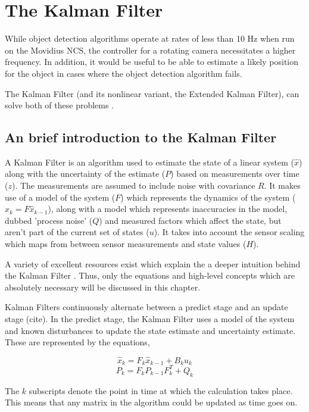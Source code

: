 \section{The Kalman Filter}

While object detection algorithms operate at rates of less than 10 Hz when run on the Movidius NCS, the controller for a rotating camera necessitates a higher frequency. In addition, it would be useful to be able to estimate a likely position for the object in cases where the object detection algorithm fails.

The Kalman Filter (and its nonlinear variant, the Extended Kalman Filter), can solve both of these problems \cite{kalman1960new}.

\subsection{An brief introduction to the Kalman Filter}
A Kalman Filter is an algorithm used to estimate the state of a linear system ($\hat{x}$) along with the uncertainty of the estimate ($P$) based on measurements over time ($z$). The measurements are assumed to include noise with covariance $R$. It makes use of a model of the system ($F$) which represents the dynamics of the system ($\hat{x}_{k} = F\hat{x}_{k-1}$), along with a model which represents inaccuracies in the model, dubbed 'process noise' ($Q$) and measured factors which affect the state, but aren't part of the current set of states ($u$). It takes into account the sensor scaling which maps from between sensor measurements and state values ($H$).

A variety of excellent resources exist which explain the a deeper intuition behind the Kalman Filter \cite{website:wlu_kalman_tutorial, website:bzarg_kalman_tutorial}. Thus, only the equations and high-level concepts which are absolutely necessary will be discussed in this chapter.

Kalman Filters continuously alternate between a predict stage and an update stage {\color{red} (cite)}. In the predict stage, the Kalman Filter uses a model of the system and known disturbances to update the state estimate and uncertainty estimate. These are represented by the equations,

\[ \hat{x}_k = F_k \hat{x}_{k-1} + B_k u_k \]
\[ P_k = F_k P_{k-1} F_k^T + Q_k \]

The $k$ subscripts denote the point in time at which the calculation takes place. This means that any matrix in the algorithm could be updated as time goes on.

